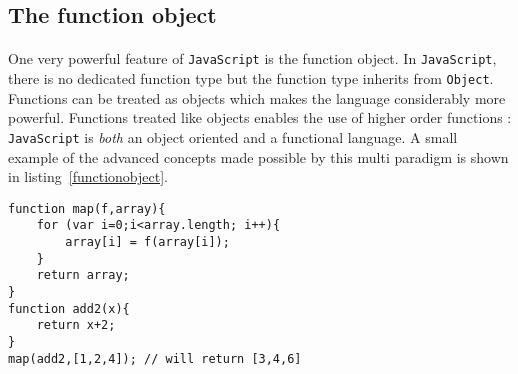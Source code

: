 \subsection{The function object}
\paragraph{}
One very powerful feature of \texttt{JavaScript} is the function object. In \texttt{JavaScript}, there is no dedicated function type but the function type inherits from \texttt{Object}. Functions can be treated as objects which makes the language considerably more powerful. Functions treated like objects enables the use of higher order functions :  \texttt{JavaScript} is \emph{both} an object oriented and a functional language. A small example of the advanced concepts made possible by this multi paradigm is shown in listing~\ref{functionobject}.

\begin{lstlisting}[caption=Inheritance,label=functionobject]
function map(f,array){
	for (var i=0;i<array.length; i++){
		array[i] = f(array[i]);
	}
	return array;
}
function add2(x){
	return x+2;
}
map(add2,[1,2,4]); // will return [3,4,6]
\end{lstlisting}	
